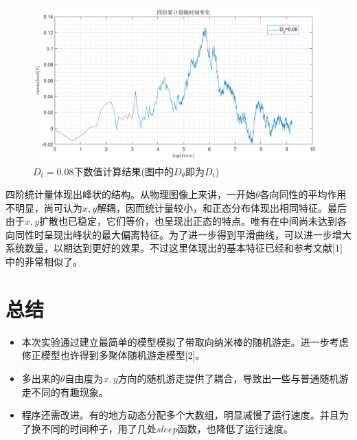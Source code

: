 \documentclass[UTF8]{ctexart}
\begin{document}
	\begin{figure}[H]
		\centering  %
		\includegraphics[width=6in]{cumulant}
		\caption{$D_t=0.08$下数值计算结果(图中的$D_\theta$即为$D_t$)}
	\end{figure}

	\begin{flushleft}
		四阶统计量体现出峰状的结构。从物理图像上来讲，一开始$\theta$各向同性的平均作用不明显，尚可认为$x,y$解耦，因而统计量较小，和正态分布体现出相同特征。最后由于$x,y$扩散也已稳定，它们等价，也呈现出正态的特点。唯有在中间尚未达到各向同性时呈现出峰状的最大偏离特征。为了进一步得到平滑曲线，可以进一步增大系统数量，以期达到更好的效果。不过这里体现出的基本特征已经和参考文献[1]中的非常相似了。
	\end{flushleft}
%		
%		
%	
%		
%		


	


	\newpage
	\section{总结}
	\begin{itemize}
		\item 本次实验通过建立最简单的模型模拟了带取向纳米棒的随机游走。进一步考虑修正模型也许得到多聚体随机游走模型[2]。
		\item 多出来的$\theta$自由度为$x,y$方向的随机游走提供了耦合，导致出一些与普通随机游走不同的有趣现象。
		\item 程序还需改进。有的地方动态分配多个大数组，明显减慢了运行速度。并且为了换不同的时间种子，用了几处$sleep$函数，也降低了运行速度。
	\end{itemize}
	
\end{document}
